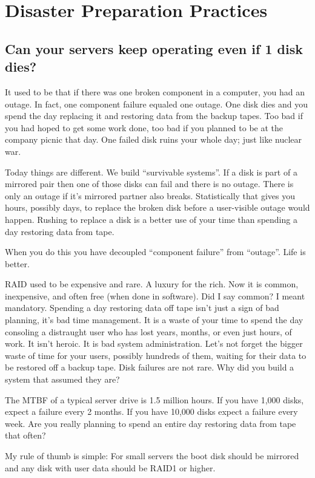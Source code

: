\documentclass{article}
\begin{document}
\section{Disaster Preparation Practices}
\subsection{Can your servers keep operating even if 1 disk dies?}
It used to be that if there was one broken component in a computer, you had an outage. In fact, one component failure equaled one outage. One disk dies and you spend the day replacing it and restoring data from the backup tapes. Too bad if you had hoped to get some work done, too bad if you planned to be at the company picnic that day. One failed disk ruins your whole day; just like nuclear war.

Today things are different. We build ``survivable systems''. If a disk is part of a mirrored pair then one of those disks can fail and there is no outage. There is only an outage if it's mirrored partner also breaks. Statistically that gives you hours, possibly days, to replace the broken disk before a user-visible outage would happen. Rushing to replace a disk is a better use of your time than spending a day restoring data from tape.

When you do this you have decoupled ``component failure'' from ``outage''. Life is better.

RAID used to be expensive and rare. A luxury for the rich. Now it is common, inexpensive, and often free (when done in software). Did I say common? I meant mandatory. Spending a day restoring data off tape isn't just a sign of bad planning, it's bad time management. It is a waste of your time to spend the day consoling a distraught user who has lost years, months, or even just hours, of work. It isn't heroic. It is bad system administration. Let's not forget the bigger waste of time for your users, possibly hundreds of them, waiting for their data to be restored off a backup tape. Disk failures are not rare. Why did you build a system that assumed they are?

The MTBF of a typical server drive is 1.5 million hours. If you have 1,000 disks, expect a failure every 2 months. If you have 10,000 disks expect a failure every week. Are you really planning to spend an entire day restoring data from tape that often?

My rule of thumb is simple: For small servers the boot disk should be mirrored and any disk with user data should be RAID1 or higher.
\end{document}
